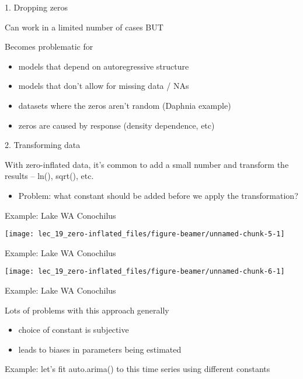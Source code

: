 \documentclass[ignorenonframetext,]{beamer}
\providecommand{\tightlist}{%
  \setlength{\itemsep}{0pt}\setlength{\parskip}{0pt}}
\begin{document}
\begin{frame}{1. Dropping zeros}

Can work in a limited number of cases BUT

Becomes problematic for

\begin{itemize}
\item
  models that depend on autoregressive structure
\item
  models that don't allow for missing data / NAs
\item
  datasets where the zeros aren't random (Daphnia example)
\item
  zeros are caused by response (density dependence, etc)
\end{itemize}

\end{frame}

\begin{frame}{2. Transforming data}

With zero-inflated data, it's common to add a small number and transform
the results -- ln(), sqrt(), etc.

\begin{itemize}
\tightlist
\item
  Problem: what constant should be added before we apply the
  transformation?
\end{itemize}

\end{frame}

\begin{frame}{Example: Lake WA Conochilus}

\begin{center}\texttt{[image: lec\_19\_zero-inflated\_files/figure-beamer/unnamed-chunk-5-1]} \end{center}

\end{frame}

\begin{frame}{Example: Lake WA Conochilus}

\begin{center}\texttt{[image: lec\_19\_zero-inflated\_files/figure-beamer/unnamed-chunk-6-1]} \end{center}

\end{frame}

\begin{frame}{Example: Lake WA Conochilus}

Lots of problems with this approach generally

\begin{itemize}
\item
  choice of constant is subjective
\item
  leads to biases in parameters being estimated
\end{itemize}

Example: let's fit auto.arima() to this time series using different
constants

\end{frame}
\end{document}
